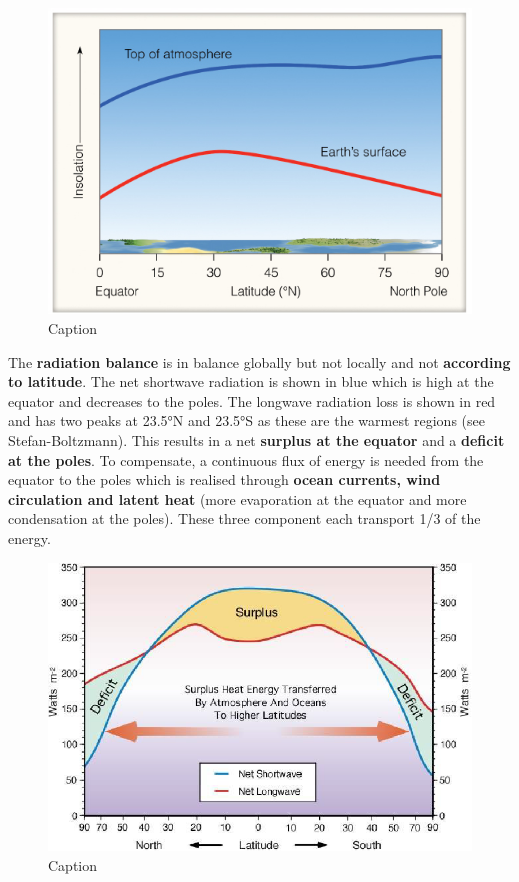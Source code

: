 \documentclass[12pt,oneside]{book}
\begin{document}
\begin{figure}

{\centering \includegraphics[width=0.8\linewidth]{figures/Figure28} 

}

\caption{Caption}\label{fig:Insolation2}
\end{figure}

The \textbf{radiation balance} is in balance globally but not locally
and not \textbf{according to latitude}. The net shortwave radiation is
shown in blue which is high at the equator and decreases to the poles.
The longwave radiation loss is shown in red and has two peaks at 23.5°N
and 23.5°S as these are the warmest regions (see Stefan-Boltzmann). This
results in a net \textbf{surplus at the equator} and a \textbf{deficit
at the poles}. To compensate, a continuous flux of energy is needed from
the equator to the poles which is realised through \textbf{ocean
currents, wind circulation and latent heat} (more evaporation at the
equator and more condensation at the poles). These three component each
transport 1/3 of the energy.

\begin{figure}

{\centering \includegraphics[width=0.9\linewidth]{figures/Figure29} 

}

\caption{Caption}\label{fig:Insolation3}
\end{figure}
\end{document}

